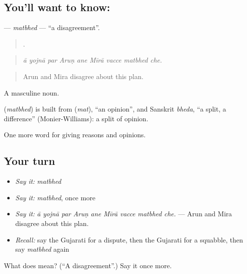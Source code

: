 \subsection*{You'll want to know: }
\textbf{} — \emph{matbhed} — \textquotedblleft{}a disagreement\textquotedblright{}.

\begin{quote}
        .
\end{quote}

\begin{quote}
\emph{ā yojnā par Aruṇ ane Mīrā vacce matbhed che.}
\end{quote}

\begin{quote}
Arun and Mira disagree about this plan.
\end{quote}

A masculine noun.

\begin{cousinweb}
\textbf{} (\emph{matbhed}) is built from \textbf{} (\emph{mat}), \textquotedblleft{}an opinion\textquotedblright{}, and Sanskrit \emph{bheda}, \textquotedblleft{}a split, a difference\textquotedblright{} (Monier-Williams): a split of opinion.
\end{cousinweb}

\begin{grammarlens}[title={What you've built}]
One more word for giving reasons and opinions.
\end{grammarlens}

\subsection*{Your turn}
\begin{itemize}
\raggedright
  \item \emph{Say it:} \emph{matbhed}
  \item \emph{Say it:} \emph{matbhed}, once more
  \item \emph{Say it:} \emph{ā yojnā par Aruṇ ane Mīrā vacce matbhed che.} — Arun and Mira disagree about this plan.
  \item \emph{Recall:} say the Gujarati for a dispute, then the Gujarati for a squabble, then say \emph{matbhed} again
\end{itemize}

\begin{tcolorbox}[breakable,colback=teal!4,colframe=teal!35!black,title={Before you move on}]
What does  mean? (\textquotedblleft{}A disagreement\textquotedblright{}.) Say it once more.
\end{tcolorbox}
